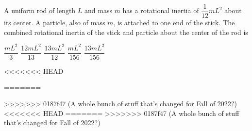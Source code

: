 \documentclass{../../oss-apphys-exam}
\begin{document}
\begin{multicols*}{2}
\begin{questions}
    \question A uniform rod of length $L$ and mass $m$ has a rotational inertia
    of $\dfrac1{12}mL^2$ about its center. A particle, also of mass $m$, is
    attached to one end of the stick. The combined rotational inertia of the
    stick and particle about the center of the rod is
    \begin{center}
    \end{center}
    \begin{choices}
      \choice$\dfrac{mL^2}3$
      \choice$\dfrac{12mL^2}{13}$
      \choice$\dfrac{13mL^2}{12}$
      \choice$\dfrac{mL^2}{156}$
      \choice$\dfrac{13mL^2}{156}$
    \end{choices}
<<<<<<< HEAD

=======
    \columnbreak
    
>>>>>>> 0187f47 (A whole bunch of stuff that's changed for Fall of 2022?)
<<<<<<< HEAD
    \columnbreak
=======
>>>>>>> 0187f47 (A whole bunch of stuff that's changed for Fall of 2022?)
    

\end{questions}
\end{multicols*}
\end{document}
